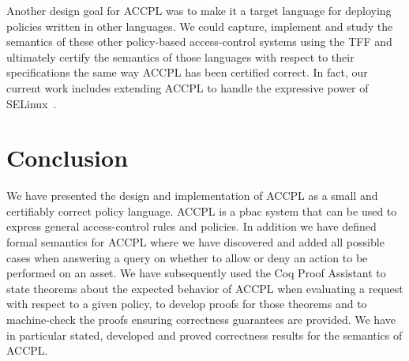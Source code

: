 \documentclass[conference]{IEEEtran}
\begin{document}
Another design goal for \ac{ACCPL} was to make it a target language for deploying policies written in other languages. We could capture, implement and study the semantics of these other policy-based access-control systems using the TFF and ultimately certify the semantics of those languages with respect to their specifications the same way \ac{ACCPL} has been certified correct. 
%
In fact, our current work includes extending ACCPL to handle the
expressive power of SELinux~\cite{EamanSistanyFelty:MCETECH17}.

\section{Conclusion}
We have presented the design and implementation of \ac{ACCPL} as a small and certifiably correct policy language. \ac{ACCPL} is a \ac{pbac} system that can be used to express general access-control rules and policies. In addition we have defined formal semantics for \ac{ACCPL} where we have discovered and added all possible cases when answering a query on whether to allow or deny an action to be performed on an asset. We have subsequently used the Coq Proof Assistant to state theorems about the expected behavior of \ac{ACCPL} when evaluating a request with respect to a given policy, to develop proofs for those theorems and to machine-check the proofs ensuring correctness guarantees are provided. We have in particular stated, developed and proved correctness results for the semantics of \ac{ACCPL}. 






%
\end{document}
